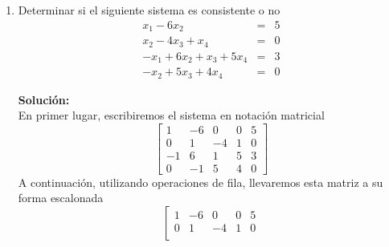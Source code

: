 \documentclass[12pt]{article}
\newenvironment{solucion}
{\begin{mdframed}[backgroundcolor=black!10]
		{\bf Solución:}\\
	}
	{
	\end{mdframed}
}
\newenvironment{preguntas}
{\begin{enumerate}\itemsep12pt
	}
	{
	\end{enumerate}
}
\begin{document}
\begin{preguntas}
\begin{solucion}
\begin{enumerate}[a)]
\item $
			\begin{bmatrix}
			-4 & 2 & 1 &  0\\
			2  & 1 & 2 & -1\\
			-3 & 5 &-6& -2
			\end{bmatrix}
			\Longrightarrow
			\begin{array}{rcr}
			-4x_1 + 2x_2 + x_3& = & 0\\
			2x_1 + x_2 + 2x_3& = & -1\\
			-3x_1 + 5x_2 - 6x_3 & = & -2
			\end{array}
			$
\item $
			\begin{bmatrix}
			2 & 1 & -3 & 0\\
			1  & -2 & 0 & 12\\
			4 & 2 &1& 8
			\end{bmatrix}
			\Longrightarrow
			\begin{array}{rcr}
			2x_1 + x_2 - 3x_3& = & 0\\
			x_1-2x_2& = & 12\\
			4x_1+2x_2+x_3 & = & 8
			\end{array}
			$
\end{enumerate}
\end{solucion}
\item Determinar si el siguiente sistema es consistente o no
	$$
	\begin{array}{rcr}
	x_1 -6x_2& = & 5\\
	x_2-4x_3+x_4& = & 0\\
	-x_1+6x_2+x_3+5x_4& = & 3\\
	-x_2+5x_3+4x_4 & = & 0
	\end{array}
	$$
\begin{solucion}
En primer lugar, escribiremos el sistema en notación matricial
		$$
		\left[
		\begin{array}{cccc|c}
		1 & -6 & 0 & 0 & 5\\
		0 & 1 & -4 & 1 & 0\\
		-1& 6 & 1 & 5 & 3 \\
		0 & -1 & 5 & 4 &0
		\end{array}
		\right]$$
		A continuación, utilizando operaciones de fila, llevaremos esta matriz a su forma escalonada
		$$\left[
		\begin{array}{cccc|c}
			1 & -6 & 0 & 0 & 5\\
			0 & 1 & -4 & 1 & 0\\

\end{array}$$
\end{solucion}
\end{preguntas}
\end{document}
